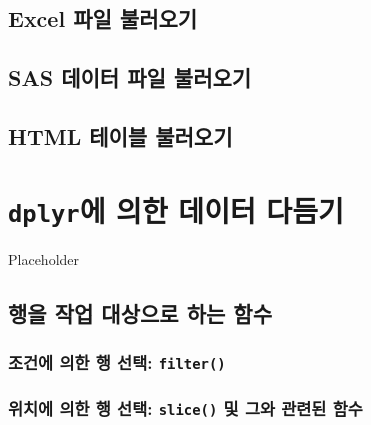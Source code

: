\documentclass[
]{book}
\begin{document}
\hypertarget{excel-uxd30cuxc77c-uxbd88uxb7ecuxc624uxae30}{%
\section{Excel 파일 불러오기}\label{excel-uxd30cuxc77c-uxbd88uxb7ecuxc624uxae30}}

\hypertarget{sas-uxb370uxc774uxd130-uxd30cuxc77c-uxbd88uxb7ecuxc624uxae30}{%
\section{SAS 데이터 파일 불러오기}\label{sas-uxb370uxc774uxd130-uxd30cuxc77c-uxbd88uxb7ecuxc624uxae30}}

\hypertarget{html-uxd14cuxc774uxbe14-uxbd88uxb7ecuxc624uxae30}{%
\section{HTML 테이블 불러오기}\label{html-uxd14cuxc774uxbe14-uxbd88uxb7ecuxc624uxae30}}

\hypertarget{dplyruxc5d0-uxc758uxd55c-uxb370uxc774uxd130-uxb2e4uxb4ecuxae30}{%
\chapter{\texorpdfstring{\texttt{dplyr}에 의한 데이터 다듬기}{dplyr에 의한 데이터 다듬기}}\label{dplyruxc5d0-uxc758uxd55c-uxb370uxc774uxd130-uxb2e4uxb4ecuxae30}}

Placeholder

\hypertarget{uxd589uxc744-uxc791uxc5c5-uxb300uxc0c1uxc73cuxb85c-uxd558uxb294-uxd568uxc218}{%
\section{행을 작업 대상으로 하는 함수}\label{uxd589uxc744-uxc791uxc5c5-uxb300uxc0c1uxc73cuxb85c-uxd558uxb294-uxd568uxc218}}

\hypertarget{uxc870uxac74uxc5d0-uxc758uxd55c-uxd589-uxc120uxd0dd-filter}{%
\subsection{\texorpdfstring{조건에 의한 행 선택: \texttt{filter()}}{조건에 의한 행 선택: filter()}}\label{uxc870uxac74uxc5d0-uxc758uxd55c-uxd589-uxc120uxd0dd-filter}}

\hypertarget{uxc704uxce58uxc5d0-uxc758uxd55c-uxd589-uxc120uxd0dd-slice-uxbc0f-uxadf8uxc640-uxad00uxb828uxb41c-uxd568uxc218}{%
\subsection{\texorpdfstring{위치에 의한 행 선택: \texttt{slice()} 및 그와 관련된 함수}{위치에 의한 행 선택: slice() 및 그와 관련된 함수}}\label{uxc704uxce58uxc5d0-uxc758uxd55c-uxd589-uxc120uxd0dd-slice-uxbc0f-uxadf8uxc640-uxad00uxb828uxb41c-uxd568uxc218}}
\end{document}
